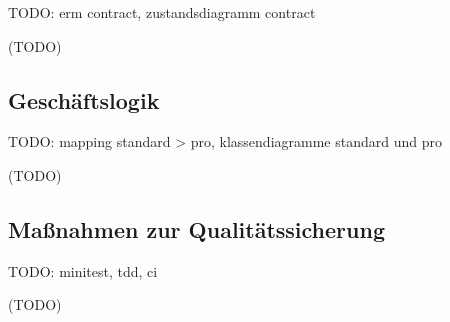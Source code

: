 TODO: erm contract, zustandsdiagramm contract

(TODO)

\subsection{Geschäftslogik}
\label{sec:Geschäftslogik}

TODO: mapping standard > pro, klassendiagramme standard und pro

(TODO)

\subsection{Maßnahmen zur Qualitätssicherung}
\label{sec:Qualitaetssicherung}

TODO: minitest, tdd, ci

(TODO)

